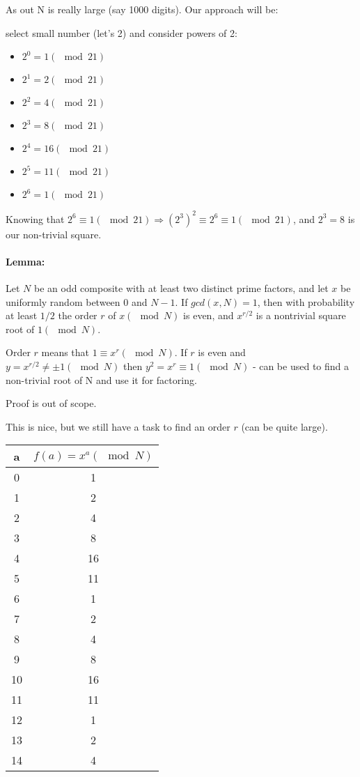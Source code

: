 \documentclass{scrartcl}
\newcommand{\means}{\Rightarrow} %
\begin{document}
As out N is really large (say 1000 digits). Our approach will be:

select small number (let's 2) and consider powers of 2:
\begin{itemize}
\item $2^0 = 1(\mod 21)$
\item $2^1 = 2(\mod 21)$
\item $2^2 = 4(\mod 21)$
\item $2^3 = 8(\mod 21)$
\item $2^4 = 16(\mod 21)$
\item $2^5 = 11(\mod 21)$
\item $2^6 = 1(\mod 21)$
\end{itemize}

Knowing that $2^6 \equiv 1(\mod21) \means (2^3)^2 \equiv 2^6 \equiv 1(\mod21)$,
and $2^3 = 8$ is our non-trivial square.

\paragraph{Lemma:} Let $N$ be an odd composite with at least two distinct prime
factors, and let $x$ be uniformly random between 0 and $N-1$. If $gcd(x, N) =
1$, then with probability at least $1/2$ the order $r$ of $x (\mod N)$ is even,
and $x^{r/2}$ is a nontrivial square root of $1 (\mod N)$.

Order $r$ means that $1 \equiv x^r (\mod N)$. If $r$ is even and $y = x^{r/2}
\neq \pm 1 (\mod N)$ then $y^2 = x^r \equiv 1 (\mod N)$ - can be used to find a
non-trivial root of N and use it for factoring.

Proof is out of scope.

This is nice, but we still have a task to find an order $r$ (can be quite
large).

\begin{tabular}{c|c}
  \textbf{ a } & \textbf{ $f(a) = x^a (\mod N)$ } \\
  \hline
  0 & 1  \\
  1 & 2  \\
  2 & 4  \\
  3 & 8  \\
  4 & 16  \\
  5 & 11  \\
  6 & 1  \\
  7 & 2  \\
  8 & 4  \\
  9 & 8  \\
  10 & 16  \\
  11 & 11  \\
  12 & 1  \\
  13 & 2  \\
  14 & 4  \\
\end{tabular}
\end{document}
